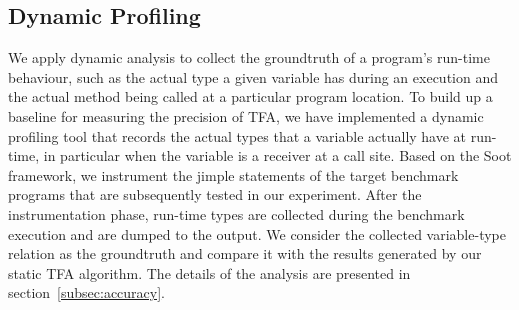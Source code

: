 \documentclass{fac}
\begin{document}
\subsection{Dynamic Profiling}\label{subsec:dynamic-profiler}


We apply dynamic analysis to collect the groundtruth of a program's run-time behaviour, such as the actual type a given variable has during an execution and the actual method being called at a particular program location. To build up a baseline for measuring the precision of TFA, we have implemented a dynamic profiling tool that records the actual types that a variable actually have at run-time, in particular when the variable is a receiver at a call site. Based on the Soot framework, we instrument the jimple statements of the target benchmark programs that are subsequently tested in our experiment. After the instrumentation phase, run-time types are collected during the benchmark execution and are dumped to the output. We consider the collected variable-type relation as the groundtruth and compare it with the results generated by our static TFA algorithm. The details of the analysis are presented in section~\ref{subsec:accuracy}. %
%
%
%
\end{document}
